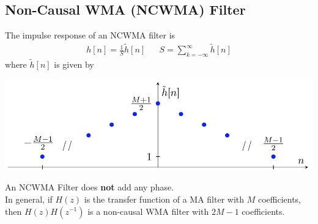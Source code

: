 \subsection{Non-Causal WMA (NCWMA) Filter}
The impulse response of an NCWMA filter is
\begin{align*}
	h[n] = \frac{1}{S}\tilde{h}[n] && S = \sum\limits_{k=-\infty}^\infty \tilde{h}[n]
\end{align*}
\vspace{-0.25em}
where $\tilde{h}[n]$ is given by
\vspace{-0.8em}
\begin{center}
	\includegraphics[width = .7\linewidth]{Filtering/NCWMAImpulseResponse.png}
\end{center}
An NCWMA Filter does \textbf{not} add any phase.\\
In general, if $H(z)$ is the transfer function of a MA filter with $M$ coefficients, then $H(z)H(z^{-1})$ is a non-causal WMA filter with $2M-1$ coefficients. 

